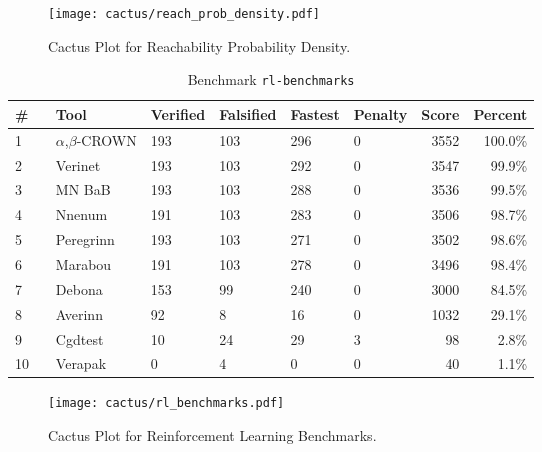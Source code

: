 \begin{figure}[h]
\centerline{\texttt{[image: cactus/reach\_prob\_density.pdf]}}
\caption{Cactus Plot for Reachability Probability Density.}
\label{fig:quantPic}
\end{figure}



\begin{table}[h]
\begin{center}
\caption{Benchmark \texttt{rl-benchmarks}} \label{tab:cat_{cat}}
{\setlength{\tabcolsep}{2pt}
\begin{tabular}[h]{@{}llllllrr@{}}
\toprule
\textbf{\# ~} & \textbf{Tool} & \textbf{Verified} & \textbf{Falsified} & \textbf{Fastest} & \textbf{Penalty} & \textbf{Score} & \textbf{Percent}\\
\midrule
1 & $\alpha$,$\beta$-CROWN & 193 & 103 & 296 & 0 & 3552 & 100.0\% \\
2 & Verinet & 193 & 103 & 292 & 0 & 3547 & 99.9\% \\
3 & MN BaB & 193 & 103 & 288 & 0 & 3536 & 99.5\% \\
4 & Nnenum & 191 & 103 & 283 & 0 & 3506 & 98.7\% \\
5 & Peregrinn & 193 & 103 & 271 & 0 & 3502 & 98.6\% \\
6 & Marabou & 191 & 103 & 278 & 0 & 3496 & 98.4\% \\
7 & Debona & 153 & 99 & 240 & 0 & 3000 & 84.5\% \\
8 & Averinn & 92 & 8 & 16 & 0 & 1032 & 29.1\% \\
9 & Cgdtest & 10 & 24 & 29 & 3 & 98 & 2.8\% \\
10 & Verapak & 0 & 4 & 0 & 0 & 40 & 1.1\% \\
\bottomrule
\end{tabular}
}
\end{center}
\end{table}



\begin{figure}[h]
\centerline{\texttt{[image: cactus/rl\_benchmarks.pdf]}}
\caption{Cactus Plot for Reinforcement Learning Benchmarks.}
\label{fig:quantPic}
\end{figure}



